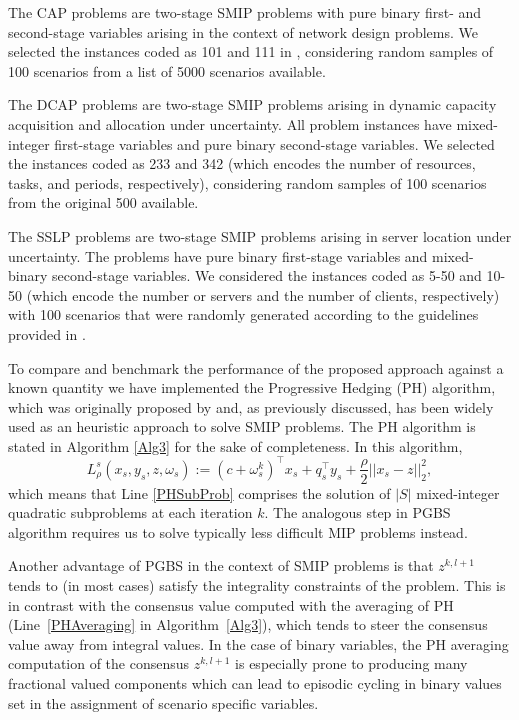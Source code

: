 \documentclass[preprint, 1p, review]{elsarticle}
\begin{document}
The CAP problems are two-stage SMIP problems with pure binary first- and second-stage variables arising in the context of network design problems. We selected the instances coded as 101 and 111 in \cite{boduretal2014}, considering random samples of 100 scenarios from a list of 5000 scenarios available. 

The DCAP problems are two-stage SMIP problems arising in dynamic capacity acquisition and allocation under uncertainty. All problem instances have mixed-integer first-stage variables and pure binary second-stage variables. We selected the instances coded as 233 and 342 (which encodes the number of resources, tasks, and periods, respectively), considering random samples of 100 scenarios from the original 500 available.

The SSLP problems are two-stage SMIP problems arising in server location under uncertainty. The problems have pure binary first-stage variables and mixed-binary second-stage variables. We considered the instances coded as 5-50 and 10-50 (which encode the number or servers and the number of clients, respectively) with 100 scenarios that were randomly generated according to the guidelines provided in \cite{ntaimosen2005}. 

To compare and benchmark the performance of the proposed approach against a known quantity we have implemented the Progressive Hedging (PH) algorithm, which was originally proposed by \cite{RockafellarPH1991} and, as previously discussed, has been widely used as an heuristic approach to solve SMIP problems. The PH algorithm is stated in Algorithm \ref{Alg3} for the sake of completeness. In this algorithm, $$L_\rho^s(x_s,y_s,z,\omega_s) := (c + \omega_s^k)^\top x_s + q_s^\top y_s + \frac{\rho}{2}||x_s - z||_2^2,$$ 
which means that Line \ref{PHSubProb} comprises the solution of $|S|$ mixed-integer quadratic subproblems at each iteration $k$. The analogous step in PGBS algorithm requires us to solve typically less difficult MIP problems instead. 

Another advantage of PGBS in the context of SMIP problems is that $z^{k,l+1}$ tends to (in most cases) satisfy the integrality constraints of the problem. This is in contrast with the consensus value computed with the averaging of PH (Line~\ref{PHAveraging} in Algorithm~\ref{Alg3}), which tends to steer the consensus value away from integral values. 
In the case of binary variables, the PH averaging computation of the consensus $z^{k,l+1}$ is especially prone to producing many fractional valued components which can lead to episodic cycling in binary values set in the assignment of scenario specific variables. 
\end{document}
